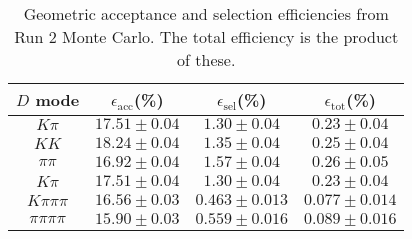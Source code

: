 \begin{table}[H]
    \centering
    \begin{tabular}{cccc}
        \toprule
        $D$ mode & $\epsilon_\mathrm{acc}$(\%) &  $\epsilon_\mathrm{sel}$(\%) &  $\epsilon_\mathrm{tot}$(\%) \\
        \midrule
        $K\pi$ & $17.51 \pm 0.04$ & $1.30 \pm 0.04$ & $0.23 \pm 0.04$ \\
        $KK$ & $18.24 \pm 0.04$ & $1.35 \pm 0.04$ & $0.25 \pm 0.04$ \\
        $\pi\pi$ & $16.92 \pm 0.04$ & $1.57 \pm 0.04$ & $0.26 \pm 0.05$ \\
        $K\pi$ & $17.51 \pm 0.04$ & $1.30 \pm 0.04$ & $0.23 \pm 0.04$ \\
        $K\pi\pi\pi$ & $16.56 \pm 0.03$ & $0.463 \pm 0.013$ & $0.077 \pm 0.014$ \\
        $\pi\pi\pi\pi$ & $15.90 \pm 0.03$ & $0.559 \pm 0.016$ & $0.089 \pm 0.016$ \\
        \bottomrule
    \end{tabular}
    \caption{Geometric acceptance and selection efficiencies from  Run 2 Monte Carlo. The total efficiency is the  product of these.}
\label{tab:selection_efficiency_run2}
\end{table}
